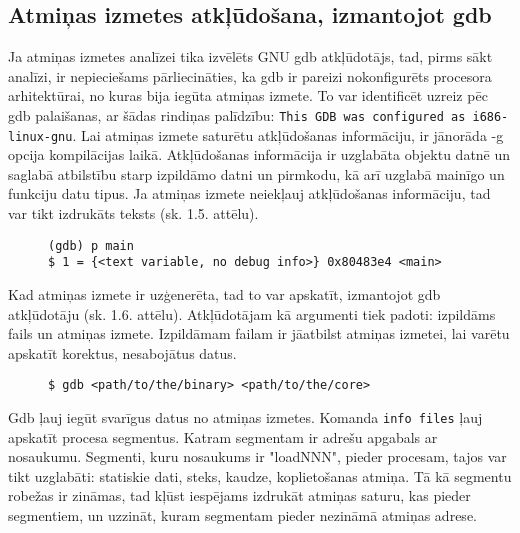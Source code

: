 \subsection{Atmiņas izmetes atkļūdošana, izmantojot gdb }
 \label{subsec:debugg_gdb}
Ja atmiņas izmetes analīzei tika izvēlēts GNU gdb atkļūdotājs, tad, pirms sākt analīzi, ir nepieciešams pārliecināties, ka gdb ir pareizi nokonfigurēts procesora arhitektūrai, no kuras bija iegūta atmiņas izmete.
To var identificēt uzreiz pēc gdb palaišanas, ar šādas rindiņas palīdzību: \texttt{This GDB was configured as i686-linux-gnu}.  
Lai atmiņas izmete saturētu atkļūdošanas informāciju, ir jānorāda -g opcija kompilācijas laikā.
Atkļūdošanas informācija ir uzglabāta objektu datnē un saglabā atbilstību starp izpildāmo datni un pirmkodu, kā arī uzglabā mainīgo un funkciju datu tipus.
Ja atmiņas izmete neiekļauj atkļūdošanas informāciju, tad var tikt izdrukāts teksts (sk. 1.5. attēlu).

\begin{figure}[h]
\begin{lstlisting}[style=customgdb]
(gdb) p main
$ 1 = {<text variable, no debug info>} 0x80483e4 <main>
\end{lstlisting}
\caption{\textbf{\fontsize{11}{12}\selectfont {Atmiņas izmete nesatur atkļūdošanas informāciju}}}
\end{figure}

Kad atmiņas izmete ir uzģenerēta, tad to var apskatīt, izmantojot gdb atkļūdotāju (sk. 1.6. attēlu). 
Atkļūdotājam kā argumenti tiek padoti: izpildāms fails un atmiņas izmete. 
Izpildāmam failam ir jāatbilst atmiņas izmetei, lai varētu apskatīt korektus, nesabojātus datus.

\begin{figure}[h]
\begin{lstlisting}[style=customgdb]
$ gdb <path/to/the/binary> <path/to/the/core>
\end{lstlisting}
\caption{\textbf{\fontsize{11}{12}\selectfont {Atmiņas izmetes atvēršana, izmantojot gdb atkļūdotāju}}}
\end{figure}

Gdb ļauj iegūt svarīgus datus no atmiņas izmetes. Komanda \texttt{info files} ļauj apskatīt procesa segmentus. 
Katram segmentam ir adrešu apgabals ar nosaukumu. 
Segmenti, kuru nosaukums ir "loadNNN", pieder procesam, tajos var tikt uzglabāti: statiskie dati, steks, kaudze, koplietošanas atmiņa.
Tā kā segmentu robežas ir zināmas, tad kļūst iespējams izdrukāt atmiņas saturu, kas pieder segmentiem, un uzzināt, kuram segmentam pieder nezināmā atmiņas adrese.

